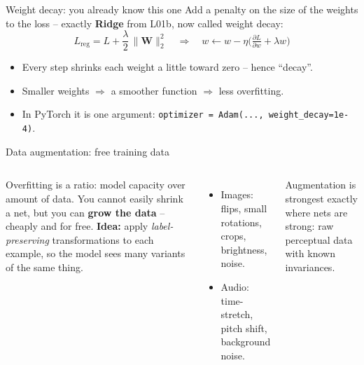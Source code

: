 \documentclass[aspectratio=169]{beamer}
\begin{document}
\begin{frame}{Weight decay: you already know this one}
  Add a penalty on the size of the weights to the loss -- exactly \textbf{Ridge} from L01b,
  now called weight decay:
  \[
    L_{\text{reg}} = L + \frac{\lambda}{2}\,\|\mathbf{W}\|_2^2
    \quad\Longrightarrow\quad
    w \leftarrow w - \eta\big(\tfrac{\partial L}{\partial w} + \lambda w\big)
  \]
  \begin{itemize}\small
    \item Every step shrinks each weight a little toward zero -- hence ``decay''.
    \item Smaller weights $\Rightarrow$ a smoother function $\Rightarrow$ less overfitting.
    \item In PyTorch it is one argument: \texttt{optimizer = Adam(..., weight\_decay=1e-4)}.
  \end{itemize}
  \vfill
\end{frame}

\begin{frame}{Data augmentation: free training data}
  \begin{columns}[T]
    Overfitting is a ratio: model capacity over amount of data. You cannot easily shrink a net,
    but you can \textbf{grow the data} -- cheaply and for free.
    \vskip 4pt
    \textbf{Idea:} apply \emph{label-preserving} transformations to each example, so the model
    sees many variants of the same thing.
    \begin{itemize}\small
      \item Images: flips, small rotations, crops, brightness, noise.
      \item Audio: time-stretch, pitch shift, background noise.
    \end{itemize}
    \vskip 4pt
    \footnotesize Augmentation is strongest exactly where nets are strong: raw perceptual data
    with known invariances.
  \end{columns}
\end{frame}
\end{document}
